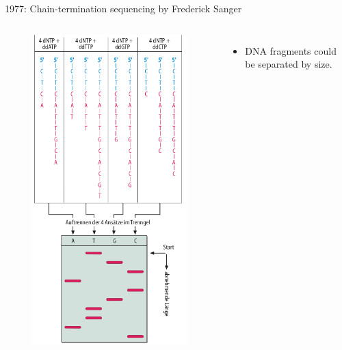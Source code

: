 \documentclass[10pt]{beamer}
\begin{document}
\begin{frame}{1977: Chain-termination sequencing by Frederick Sanger}
\begin{columns}[T,onlytextwidth]
\begin{figure}
			\includegraphics[width=\textwidth]{./figures/sangersequencing.png}
		\end{figure}
		\begin{itemize}
			\item DNA fragments could be separated by size.

\end{itemize}
\end{columns}
\end{frame}
\end{document}
